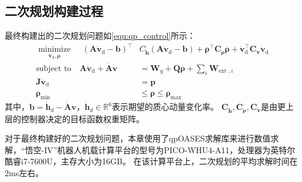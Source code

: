 \subsection{二次规划构建过程}
最终构建出的二次规划问题如\ref{equ:qp_control}所示：
\begin{equation}
    \label{equ:qp_control}
    \begin{aligned}
       \underset{{{{\dot{\boldsymbol{v}}}}_{\text{d}}},\boldsymbol{\rho}}{\mathop{\operatorname{minimize}}}\,\quad {{\left( \boldsymbol{A}{{{\dot{\boldsymbol{v}}}}_{\text{d}}}-\boldsymbol{b} \right)}^{\top }}&{{C}_{{\dot{\boldsymbol{h}}}}}\left( \boldsymbol{A}{{{\dot{\boldsymbol{v}}}}_{\text{d}}}-\boldsymbol{b} \right)+{{\boldsymbol{\rho} }^{\top }}{{\boldsymbol{C}}_{\boldsymbol{\rho} }}\boldsymbol{\rho} +\dot{\boldsymbol{v}}_{\text{d}}^{\top }{{\boldsymbol{C}}_{{\dot{\boldsymbol{v}}}}}{{{\dot{\boldsymbol{v}}}}_{\text{d}}} \\ 
        \text{subject to}\quad \boldsymbol{A}{{{\dot{\boldsymbol{v}}}}_{\text{d}}}+\dot{\boldsymbol{A}}\boldsymbol{v}&={\boldsymbol{{}W}_{g}}+\boldsymbol{Q}\boldsymbol{\rho} +\sum\limits_{i}{{{\boldsymbol{W}}_{\text{ext },i}}} \\ 
        \boldsymbol{J}{{{\dot{\boldsymbol{v}}}}_{\text{d}}}&=\boldsymbol{p} \\ 
        {{\boldsymbol{\rho} }_{\min }}&\le \boldsymbol{\rho} \le {{\boldsymbol{\rho} }_{\max }} 
      \end{aligned}
\end{equation}
其中，$\boldsymbol{b}={{\dot{\boldsymbol{h}}}_{d}}-\dot{\boldsymbol{A}}\boldsymbol{v}$，${{\dot{\boldsymbol{h}}}_{d}}\in {{\mathbb{R}}^{6}}$表示期望的质心动量变化率。
${{\boldsymbol{C}}_{{\dot{\boldsymbol{h}}}}},{\boldsymbol{{C}}_{\boldsymbol{\rho} }},{\boldsymbol{C}_{{\dot{\boldsymbol{v}}}}}$是由更上层的控制器决定的目标函数权重矩阵。

对于最终构建好的二次规划问题，本章使用了qpOASES求解库\cite{ferreau2014qpoases}来进行数值求解，“悟空-IV”机器人机载计算平台的型号为PICO-WHU4-A11，处理器为英特尔酷睿i7-7600U，主存大小为16GB。
在该计算平台上，二次规划的平均求解时间在2ms左右。
